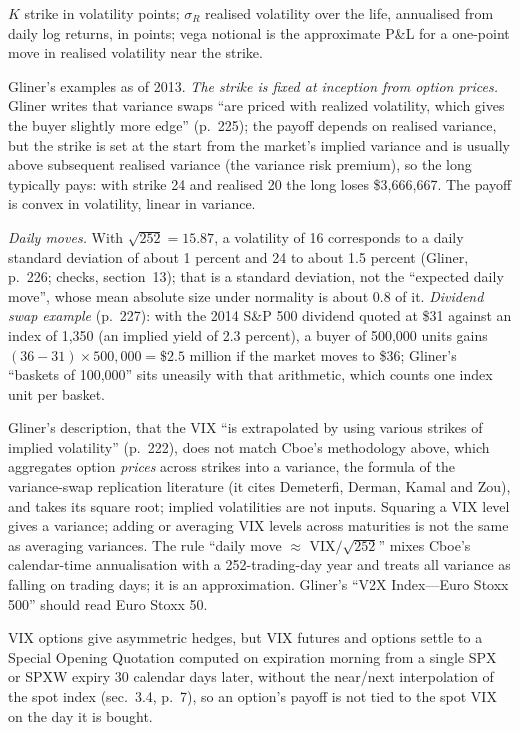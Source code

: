 \begin{qfdefinition}
 $K$ strike in volatility points; $\sigma_R$ realised volatility over the life, annualised from daily log returns, in points; vega notional is the approximate P\&L for a one-point move in realised volatility near the strike.

 Gliner's examples as of 2013. \emph{The strike is fixed at inception from option prices.} Gliner writes that variance swaps ``are priced with realized volatility, which gives the buyer slightly more edge'' (p.~225); the payoff depends on realised variance, but the strike is set at the start from the market's implied variance and is usually above subsequent realised variance (the variance risk premium), so the long typically pays: with strike 24 and realised 20 the long loses \$3,666,667. The payoff is convex in volatility, linear in variance.

 \emph{Daily moves.} With $\sqrt{252}=15.87$, a volatility of 16 corresponds to a daily standard deviation of about 1 percent and 24 to about 1.5 percent (Gliner, p.~226; checks, section~13); that is a standard deviation, not the ``expected daily move'', whose mean absolute size under normality is about 0.8 of it. \emph{Dividend swap example} (p.~227): with the 2014 S\&P 500 dividend quoted at \$31 against an index of 1,350 (an implied yield of 2.3 percent), a buyer of 500,000 units gains $(36-31)\times500{,}000=\$2.5$ million if the market moves to \$36; Gliner's ``baskets of 100,000'' sits uneasily with that arithmetic, which counts one index unit per basket.

 Gliner's description, that the VIX ``is extrapolated by using various strikes of implied volatility'' (p.~222), does not match Cboe's methodology above, which aggregates option \emph{prices} across strikes into a variance, the formula of the variance-swap replication literature (it cites Demeterfi, Derman, Kamal and Zou), and takes its square root; implied volatilities are not inputs. Squaring a VIX level gives a variance; adding or averaging VIX levels across maturities is not the same as averaging variances. The rule ``daily move $\approx$ VIX$/\sqrt{252}$'' mixes Cboe's calendar-time annualisation with a 252-trading-day year and treats all variance as falling on trading days; it is an approximation. Gliner's ``V2X Index---Euro Stoxx 500'' should read Euro Stoxx 50.

VIX options give asymmetric hedges, but VIX futures and options settle to a Special Opening Quotation computed on expiration morning from a single SPX or SPXW expiry 30 calendar days later, without the near/next interpolation of the spot index (sec.~3.4, p.~7), so an option's payoff is not tied to the spot VIX on the day it is bought.


\end{qfdefinition}
